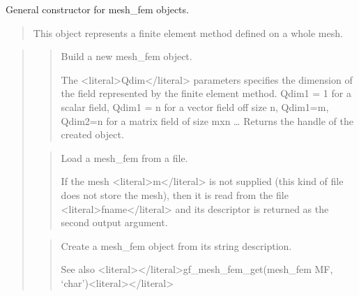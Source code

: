 \documentclass[a4paper,11pt,english]{sphinxmanual}
\begin{document}
\sphinxAtStartPar
{}

\sphinxAtStartPar
General constructor for mesh\_fem objects.
\begin{quote}

\sphinxAtStartPar
This object represents a finite element method defined on a whole mesh.
\end{quote}

\sphinxAtStartPar
{}
\begin{quote}

\sphinxAtStartPar
{}
\begin{quote}

\sphinxAtStartPar
Build a new mesh\_fem object.

\sphinxAtStartPar
The \textless{}literal\textgreater{}Qdim\textless{}/literal\textgreater{} parameters specifies the dimension of the field represented
by the finite element method. Qdim1 = 1 for a scalar field,
Qdim1 = n for a vector field off size n, Qdim1=m, Qdim2=n for
a matrix field of size mxn …
Returns the handle of the created object.
\end{quote}

\sphinxAtStartPar
{}
\begin{quote}

\sphinxAtStartPar
Load a mesh\_fem from a file.

\sphinxAtStartPar
If the mesh \textless{}literal\textgreater{}m\textless{}/literal\textgreater{} is not supplied (this kind of file does not store the
mesh), then it is read from the file \textless{}literal\textgreater{}fname\textless{}/literal\textgreater{} and its descriptor is
returned as the second output argument.
\end{quote}

\sphinxAtStartPar
{}
\begin{quote}

\sphinxAtStartPar
Create a mesh\_fem object from its string description.

\sphinxAtStartPar
See also \textless{}literal\textgreater{}\textless{}/literal\textgreater{}gf\_mesh\_fem\_get(mesh\_fem MF, ‘char’)\textless{}literal\textgreater{}\textless{}/literal\textgreater{}
\end{quote}


\end{quote}
\end{document}
